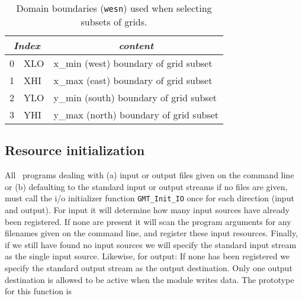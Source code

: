 \documentclass{report}
\begin{document}
\begin{table}[h]
\small
\centering
\begin{tabular}{|c|l|l|} \hline
\multicolumn{2}{|c|}{\emph{Index}} & \multicolumn{1}{c|}{\emph{content}} \\ \hline
0 & XLO	&       x\_min (west) boundary of grid subset  \\ \hline
1 & XHI	&       x\_max (east) boundary of grid subset  \\ \hline
2 & YLO	&       y\_min (south) boundary of grid subset  \\ \hline
3 & YHI	&       y\_max (north) boundary of grid subset  \\ \hline
\end{tabular}
\caption{Domain boundaries (\texttt{wesn}) used when selecting subsets of grids.}
\label{tbl:wesn}
\end{table}

\subsection{Resource initialization}
All \GMT\ programs dealing with (a) input or output files given on the command line or (b) defaulting to
the standard input or output streams if no files are given, must call the i/o initializer function
\texttt{GMT\_Init\_IO} once for each direction (input and output).
For input it will determine how many input sources have already been registered.
If none are present it will scan the program arguments for any filenames given on the command line, and register
these input resources.  Finally, if we still have found no input sources we will specify the standard input stream
as the single input source.  Likewise, for output: If none has been registered we specify the standard output stream
as the output destination.  Only one output destination is allowed to be active when the module writes data.
The prototype for this function is
\end{document}
